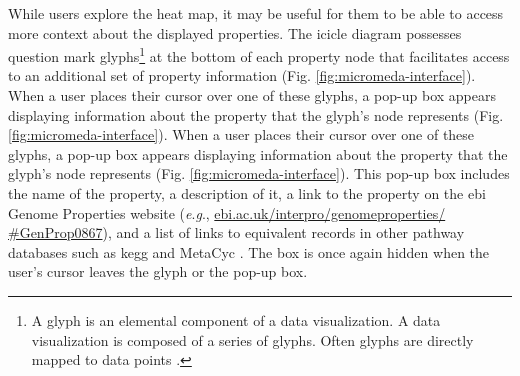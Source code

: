 While users explore the heat map, it may be useful for them to be able to access 
more context about the displayed properties. The icicle diagram possesses 
question mark glyphs\footnote{A glyph is an elemental component of a data 
visualization. A data visualization is composed of a series of glyphs. Often 
glyphs are directly mapped to data points \cite{chen}.} at the bottom of each 
property node that facilitates access to an additional set of property 
information (Fig. \ref{fig:micromeda-interface}). When a user places their 
cursor over one of these glyphs, a pop-up box appears displaying information 
about the property that the glyph's node represents (Fig. 
\ref{fig:micromeda-interface}). When a user places their cursor over one of 
these glyphs, a pop-up box appears displaying information about the property 
that the glyph's node represents (Fig. \ref{fig:micromeda-interface}). This 
pop-up box includes the name of the property, a description of it, a link to the 
property on the \gls{ebi}  Genome Properties website (\textit{e}.\textit{g}., 
\href{https://www.ebi.ac.uk/interpro/genomeproperties/#GenProp0867}{ebi.ac.uk/interpro/genomeproperties/ 
\#GenProp0867}), and a list of links to equivalent records in other pathway 
databases such as \gls{kegg} \cite{kanehisa2000kegg} and MetaCyc 
\cite{karp2002metacyc}. The box is once again hidden when the user's cursor 
leaves the glyph or the pop-up box.

